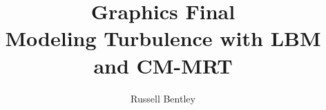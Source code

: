 \documentclass[10pt]{article}
\title{Graphics Final \\ Modeling Turbulence with LBM and CM-MRT}
\author{Russell Bentley}
\begin{document}
\maketitle

\tableofcontents

\twocolumn











\printbibliography
\end{document}

